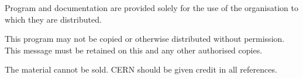 {\begin{minipage}{0.95\textwidth}
{      \vspace{1cm}\par
      Program and documentation are provided solely for the use of the
      organisation to which they are distributed. 
      \vspace{1cm}\par
      This program may not be copied or otherwise distributed without
      permission. This message must be retained on this and any other
      authorised copies. 
      \vspace{1cm}\par
      The material cannot be sold. CERN should be given credit in all
      references. 
      \vfill
    }
\end{minipage}}

\clearpage
